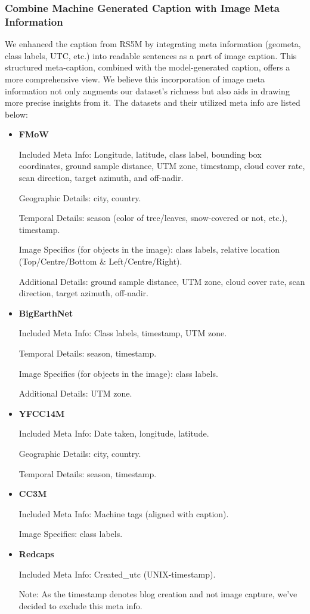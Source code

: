 \documentclass[journal]{IEEEtran}
\begin{document}
\subsubsection{Combine Machine Generated Caption with Image Meta Information}
\label{appendix:metacap}

We enhanced the caption from RS5M by integrating meta information (geometa, class labels, UTC, etc.) into readable sentences as a part of image caption. This structured meta-caption, combined with the model-generated caption, offers a more comprehensive view. We believe this incorporation of image meta information not only augments our dataset's richness but also aids in drawing more precise insights from it. The datasets and their utilized meta info are listed below:

\begin{itemize}
    \item \textbf{FMoW}
    
    Included Meta Info: Longitude, latitude, class label, bounding box coordinates, ground sample distance, UTM zone, timestamp, cloud cover rate, scan direction, target azimuth, and off-nadir.


    Geographic Details: city, country.
    
    Temporal Details: season (color of tree/leaves, snow-covered or not, etc.), timestamp.
    
    Image Specifics (for objects in the image): class labels, relative location (Top/Centre/Bottom \& Left/Centre/Right).
    
    Additional Details: ground sample distance, UTM zone, cloud cover rate, scan direction, target azimuth, off-nadir.


    \item \textbf{BigEarthNet}
    
    Included Meta Info: Class labels, timestamp, UTM zone.
    
    Temporal Details: season, timestamp.
    
    Image Specifics (for objects in the image): class labels.
    
    Additional Details: UTM zone.

    \item \textbf{YFCC14M}
    
    Included Meta Info: Date taken, longitude, latitude.

    Geographic Details: city, country.
    
    Temporal Details: season, timestamp.
    

    \item \textbf{CC3M}

    Included Meta Info: Machine tags (aligned with caption).
    
    Image Specifics: class labels.

    \item \textbf{Redcaps}

    Included Meta Info: Created\_utc (UNIX-timestamp).
    
    Note: As the timestamp denotes blog creation and not image capture, we've decided to exclude this meta info.


\end{itemize}
\end{document}
